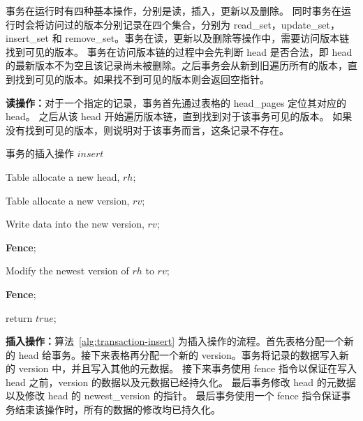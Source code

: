 




事务在运行时有四种基本操作，分别是读，插入，更新以及删除。
同时事务在运行时会将访问过的版本分别记录在四个集合，分别为 read\_set，update\_set，insert\_set 和 remove\_set。事务在读，更新以及删除等操作中，需要访问版本链找到可见的版本。
事务在访问版本链的过程中会先判断 head 是否合法，即 head 的最新版本不为空且该记录尚未被删除。之后事务会从新到旧遍历所有的版本，直到找到可见的版本。如果找不到可见的版本则会返回空指针。


\textbf{读操作：}对于一个指定的记录，事务首先通过表格的 head\_pages 定位其对应的 head。
之后从该 head 开始遍历版本链，直到找到对于该事务可见的版本。
如果没有找到可见的版本，则说明对于该事务而言，这条记录不存在。

\begin{algorithm}[h]
    \caption{事务的插入操作 $insert$}
    \label{alg:transaction-insert}
    \BlankLine
    Table allocate a new head, $rh$;

    Table allocate a new version, $rv$;

    Write data into the new version, $rv$;

    \textbf{Fence};

    Modify the newest version of $rh$ to $rv$;

    \textbf{Fence};

    return $true$;

\end{algorithm}

\textbf{插入操作：}算法~\ref{alg:transaction-insert} 为插入操作的流程。首先表格分配一个新的 head 给事务。接下来表格再分配一个新的 version。事务将记录的数据写入新的 version 中，并且写入其他的元数据。
接下来事务使用 fence 指令以保证在写入 head 之前，version 的数据以及元数据已经持久化。
最后事务修改 head 的元数据以及修改 head 的 newest\_version 的指针。
最后事务使用一个 fence 指令保证事务结束该操作时，所有的数据的修改均已持久化。



